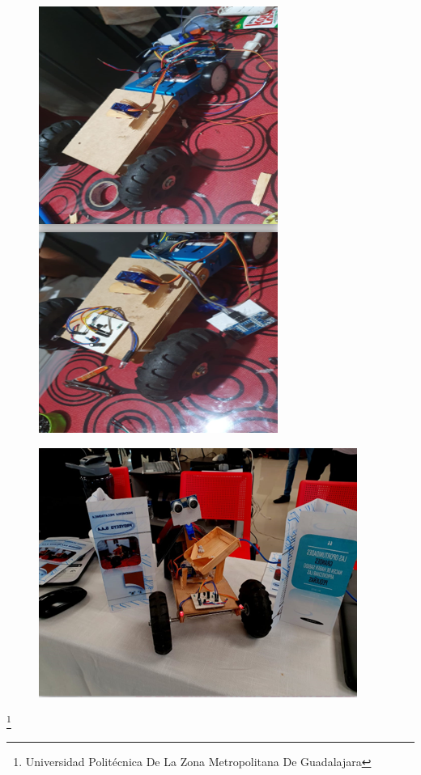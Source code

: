 \documentclass[11pt,a4paper]{article}
\begin{document}
\begin{figure}[hbtp]
\centering
\includegraphics[scale=0.70]{03.png}
\end{figure} 

\begin{figure}[hbtp]
\centering
\includegraphics[scale=0.60]{portada.png}
\end{figure} 

 \footnote{Universidad Politécnica De La Zona Metropolitana De Guadalajara} 
\newpage
\end{document}

